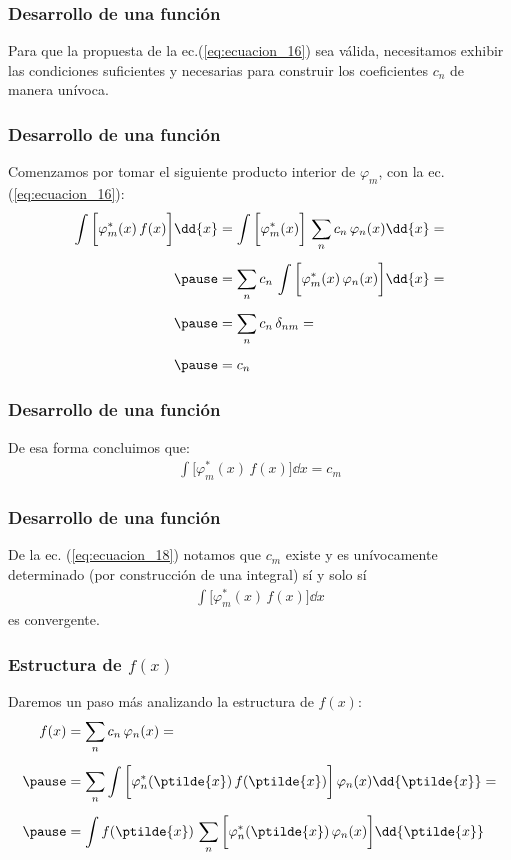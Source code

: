 \begin{frame}
\frametitle{Desarrollo de una función}
Para que la propuesta de la ec.(\ref{eq:ecuacion_16}) sea válida, necesitamos exhibir las condiciones suficientes y necesarias para construir los coeficientes $c_{n}$ de manera unívoca.
\end{frame}
\begin{frame}
\frametitle{Desarrollo de una función}
Comenzamos por tomar el siguiente producto interior de $\varphi_{m}$, con la ec.(\ref{eq:ecuacion_16}):
\fontsize{12}{12}\selectfont
\begin{eqnarray}
\begin{aligned}
\int \bigg[ \varphi_{m}^{*}(x) \, f(x) \bigg] \dd{x} &= \int \bigg[ \varphi_{m}^{*} (x) \bigg] \, \sum_{n} c_{n} \, \varphi_{n} (x) \dd{x} = \\[0.5em] \pause
&= \sum_{n} c_{n} \,\int \bigg[ \varphi_{m}^{*} (x) \, \varphi_{n} (x) \bigg] \dd{x} = \\[0.5em] \pause
&= \sum_{n} c_{n} \, \delta_{nm} = \\[0.5em] \pause
&= c_{n}
\end{aligned}
\label{eq:ecuacion_17}
\end{eqnarray}
\end{frame}
\begin{frame}
\frametitle{Desarrollo de una función}
De esa forma concluimos que:
\begin{align}
\int \bigg[ \varphi_{m}^{*}(x) \, f(x) \bigg] \dd{x} = c_{m}
\label{eq:ecuacion_18}
\end{align}
\end{frame}
\begin{frame}
\frametitle{Desarrollo de una función}
De la ec. (\ref{eq:ecuacion_18}) notamos que $c_{m}$ existe y es unívocamente determinado (por construcción de una integral) sí y solo sí
\begin{align*}
\int \bigg[ \varphi_{m}^{*}(x) \, f(x) \bigg] \dd{x} 
\end{align*}
es convergente.
\end{frame}
\begin{frame}
\frametitle{Estructura de $f(x)$}
Daremos un paso más analizando la estructura de $f(x)$:
\begin{eqnarray}
\begin{aligned}
f(x) &= \sum_{n} c_{n} \, \varphi_{n}(x) = \\[0.5em] \pause
&= \sum_{n} \int \bigg[ \varphi_{n}^{*}(\ptilde{x}) \, f(\ptilde{x}) \bigg] \, \varphi_{n} (x) \dd{\ptilde{x}} = \\[0.5em] \pause
&=  \int f(\ptilde{x}) \, \sum_{n} \bigg[ \varphi_{n}^{*}(\ptilde{x}) \, \varphi_{n}(x) \bigg] \dd{\ptilde{x}}
\end{aligned}
\label{eq:ecuacion_19}
\end{eqnarray}
\end{frame}
